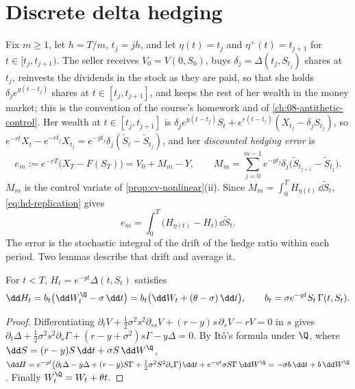 \section{Discrete delta hedging}\label{sec:hd-discrete}

Fix $m\ge1$, let $h=T/m$, $t_j=jh$, and let $\eta(t)=t_j$ and $\eta^+(t)=t_{j+1}$ for
$t\in[t_j,t_{j+1})$. The seller receives $V_0=V(0,S_0)$, buys $\delta_j=\Delta(t_j,S_{t_j})$
shares at $t_j$, reinvests the dividends in the stock as they are paid, so that she holds
$\delta_je^{y(t-t_j)}$ shares at $t\in[t_j,t_{j+1}]$, and keeps the rest of her wealth in the
money market; this is the convention of the course's homework and of \cref{ch:08-antithetic-control}. Her wealth at
$t\in[t_j,t_{j+1}]$ is $\delta_je^{y(t-t_j)}S_t+e^{r(t-t_j)}(X_{t_j}-\delta_jS_{t_j})$, so
$e^{-rt}X_t-e^{-rt_j}X_{t_j}=e^{-yt_j}\delta_j(\tilde S_t-\tilde S_{t_j})$, and her
\emph{discounted hedging error} is
\begin{equation}\label{eq:hd-error}
  e_m:=e^{-rT}\big(X_T-F(S_T)\big)=V_0+M_m-Y,\qquad
  M_m=\sum_{j=0}^{m-1}e^{-yt_j}\delta_j\big(\tilde S_{t_{j+1}}-\tilde S_{t_j}\big).
\end{equation}
$M_m$ is the control variate of \cref{prop:cv-nonlinear}(ii). Since $M_m=\int_0^TH_{\eta(t)}\,\dd\tilde S_t$,
\eqref{eq:hd-replication} gives
\begin{equation}\label{eq:hd-error-integral}
  e_m=\int_0^T\big(H_{\eta(t)}-H_t\big)\,\dd\tilde S_t .
\end{equation}
The error is the stochastic integral of the drift of the hedge ratio within each period. Two
lemmas describe that drift and average it.

\begin{lemma}\label{lem:hd-delta-dynamics}
For $t<T$, $H_t=e^{-yt}\Delta(t,S_t)$ satisfies
\[
  \dd H_t=b_t\big(\dd W^\Q_t-\sigma\,\dd t\big)=b_t\big(\dd W_t+(\theta-\sigma)\,\dd t\big),\qquad
  b_t=\sigma e^{-yt}S_t\,\Gamma(t,S_t).
\]
\end{lemma}

\begin{proof}
Differentiating $\partial_tV+\frac12\sigma^2s^2\partial_{ss}V+(r-y)s\,\partial_sV-rV=0$ in $s$ gives
$\partial_t\Delta+\frac12\sigma^2s^2\partial_s\Gamma+(r-y+\sigma^2)s\Gamma-y\Delta=0$. By It\^o's formula
under $\Q$, where $\dd S=(r-y)S\,\dd t+\sigma S\,\dd W^\Q$,
$\dd H=e^{-yt}\big(\partial_t\Delta-y\Delta+(r-y)S\Gamma+\frac12\sigma^2S^2\partial_s\Gamma\big)\dd t
+e^{-yt}\sigma S\Gamma\,\dd W^\Q=-\sigma b\,\dd t+b\,\dd W^\Q$. Finally $W^\Q_t=W_t+\theta t$.
\end{proof}

